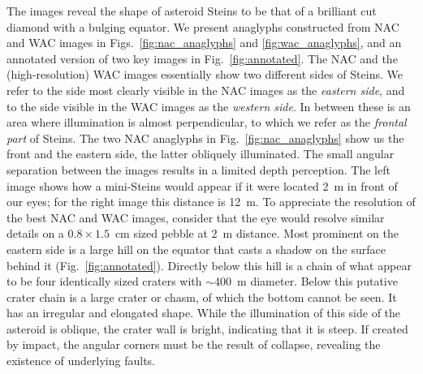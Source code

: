 \documentclass[preprint,3p,authoryear]{elsarticle}
\begin{document}
The images reveal the shape of asteroid Steins to be that of a brilliant cut diamond with a bulging equator. We present anaglyphs constructed from NAC and WAC images in Figs.~\ref{fig:nac_anaglyphs} and \ref{fig:wac_anaglyphs}, and an annotated version of two key images in Fig.~\ref{fig:annotated}. The NAC and the (high-resolution) WAC images essentially show two different sides of Steins. We refer to the side most clearly visible in the NAC images as the {\it eastern side}, and to the side visible in the WAC images as the {\it western side}. In between these is an area where illumination is almost perpendicular, to which we refer as the {\it frontal part} of Steins. The two NAC anaglyphs in Fig.~\ref{fig:nac_anaglyphs} show us the front and the eastern side, the latter obliquely illuminated. The small angular separation between the images results in a limited depth perception. The left image shows how a mini-Steins would appear if it were located 2~m in front of our eyes; for the right image this distance is 12~m. To appreciate the resolution of the best NAC and WAC images, consider that the eye would resolve similar details on a $0.8\times1.5$~cm sized pebble at 2~m distance. Most prominent on the eastern side is a large hill on the equator that casts a shadow on the surface behind it (Fig.~\ref{fig:annotated}). Directly below this hill is a chain of what appear to be four identically sized craters with $\sim$400~m diameter. Below this putative crater chain is a large crater or chasm, of which the bottom cannot be seen. It has an irregular and elongated shape. While the illumination of this side of the asteroid is oblique, the crater wall is bright, indicating that it is steep. If created by impact, the angular corners must be the result of collapse, revealing the existence of underlying faults.
\end{document}
